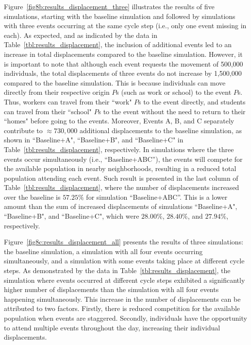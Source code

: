 Figure~\ref{fig8b:results_displacement_three} illustrates the results of five simulations, starting with the baseline simulation and followed by simulations with three events occurring at the same cycle step (i.e., only one event missing in each). 
As expected, and as indicated by the data in Table~\ref{tbl:results_displacement}, the inclusion of additional events led to an increase in total displacements compared to the baseline simulation. However, it is important to note that although each event requests the movement of 500,000 individuals, the total displacements of three events do not increase by 1,500,000 compared to the baseline simulation. This is because individuals can move directly from their respective origin $P$s (such as work or school) to the event $P$s. Thus, workers can travel from their ``work" $P$s to the event directly, and students can travel from their ``school" $P$s to the event without the need to return to their ``homes" before going to the events. Moreover, Events A, B, and C separately contribute to $\approx730,000$ additional displacements to the baseline simulation, as shown in ``Baseline+A", ``Baseline+B", and ``Baseline+C" in Table~\ref{tbl:results_displacement}, respectively.
In simulations where the three events occur simultaneously (i.e., ``Baseline+ABC''), the events will compete for the available population in nearby neighborhoods, resulting in a reduced total population attending each event. Such result is presented in the last column of Table~\ref{tbl:results_displacement}, where the number of displacements increased over the baseline is $57.25\%$ for simulation ``Baseline+ABC''. This is a lower amount than the sum of increased displacements of simulations ``Baseline+A", ``Baseline+B", and ``Baseline+C", which were $28.00\%$, $28.40\%$, and $27.94\%$, respectively.

Figure~\ref{fig8c:results_displacement_all} presents the results of three simulations: the baseline simulation, a simulation with all four events occurring simultaneously, and a simulation with some events taking place at different cycle steps. As demonstrated by the data in Table~\ref{tbl:results_displacement}, the simulation where events occurred at different cycle steps exhibited a significantly higher number of displacements than the simulation with all four events happening simultaneously. This increase in the number of displacements
can be attributed to two factors. Firstly, there is reduced competition for the available population when events are staggered. Secondly, individuals have the opportunity to attend multiple events throughout the day, increasing their individual displacements.

